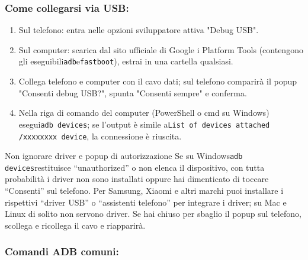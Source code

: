 \subsubsection*{Come collegarsi via USB:}

\begin{enumerate}
  \item Sul telefono: entra nelle opzioni sviluppatore attiva "Debug USB".
  \item Sul computer: scarica dal sito ufficiale di Google i Platform Tools (contengono gli eseguibili\texttt{adb}e\texttt{fastboot}), estrai in una cartella qualsiasi.
  \item Collega telefono e computer con il cavo dati; sul telefono comparirà il popup "Consenti debug USB?", spunta "Consenti sempre" e conferma.
  \item Nella riga di comando del computer (PowerShell o cmd su Windows) esegui\texttt{adb devices}; se l'output è simile a\texttt{List of devices attached /\allowbreak  xxxxxxxx device}, la connessione è riuscita.
\end{enumerate}

\begin{tcbwarn}{Non ignorare driver e popup di autorizzazione}
Se su Windows\texttt{adb devices}restituisce “unauthorized” o non elenca il dispositivo, con tutta probabilità i driver non sono installati oppure hai dimenticato di toccare “Consenti” sul telefono. Per Samsung, Xiaomi e altri marchi puoi installare i rispettivi “driver USB” o “assistenti telefono” per integrare i driver; su Mac e Linux di solito non servono driver. Se hai chiuso per sbaglio il popup sul telefono, scollega e ricollega il cavo e riapparirà.

\end{tcbwarn}

\subsubsection*{Comandi ADB comuni:}

